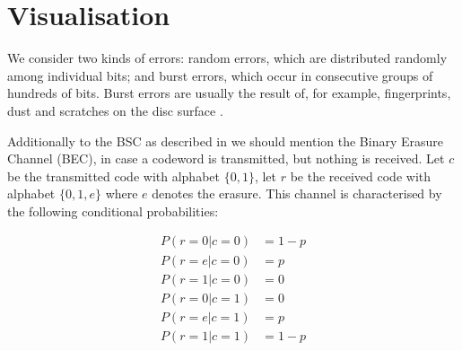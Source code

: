 \documentclass[../main.tex]{subfiles}
\begin{document}
    \chapter{Visualisation}

    We consider two kinds of errors: random errors, which are distributed randomly among individual bits; and burst errors, which occur in consecutive groups of hundreds of bits. Burst errors are usually the result of, for example, fingerprints, dust and scratches on the disc surface \autocite{wicker1999reed}.


    Additionally to the BSC as described in  we should mention the Binary Erasure Channel (BEC), in case a codeword is transmitted, but nothing is received. Let $c$ be the transmitted code with alphabet $\{0,1\}$, let $r$ be the received code with alphabet $\{0,1,e\}$ where $e$ denotes the erasure. This channel is characterised by the following conditional probabilities:

    \begin{align*}
        P(r=0 | c=0) &= 1-p\\
        P(r=e | c=0) &= p\\
        P(r=1 | c=0) &= 0\\
        P(r=0 | c=1) &= 0\\
        P(r=e | c=1) &= p\\
        P(r=1 | c=1) &= 1-p
    \end{align*}
\end{document}
